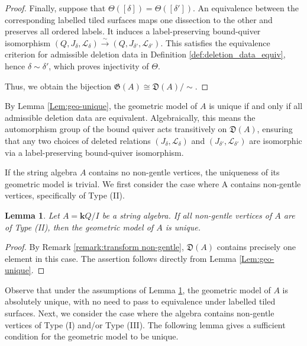 \documentclass[11pt]{amsart}
\numberwithin{equation}{section}
\newtheorem{lemma}[theorem]{Lemma}
\theoremstyle{definition}
\begin{document}
\begin{proof}
Finally, suppose that $\Theta([\delta])=\Theta([\delta'])$. An
equivalence between the corresponding labelled tiled surfaces maps
one dissection to the other and preserves all ordered labels. It induces a
label-preserving bound-quiver isomorphism
$(Q,J_\delta,\mathcal L_\delta)\xrightarrow{\sim}
(Q,J_{\delta'},\mathcal L_{\delta'})$.
This satisfies the equivalence criterion for admissible deletion data in Definition \ref{def:deletion_data_equiv}, hence \(\delta\sim\delta'\), which proves injectivity of \(\Theta\).

Thus, we obtain the bijection $\mathfrak{G}(A) \cong \mathfrak{D}(A)/{\sim}$.
\end{proof}


By Lemma \ref{Lem:geo-unique}, the geometric model of $A$ is unique if and only if all admissible deletion data are equivalent. Algebraically, this means the automorphism group of the bound quiver acts transitively on $\mathfrak{D}(A)$, ensuring that any two choices of deleted relations $(J_\delta, \mathcal{L}_\delta)$ and $(J_{\delta'}, \mathcal{L}_{\delta'})$ are isomorphic via a label-preserving bound-quiver isomorphism.

If the string algebra $A$ contains no non-gentle vertices, the uniqueness of its geometric model is trivial. We first consider the case where A contains non-gentle vertices, specifically of Type (II).

\begin{lemma} \label{lem:non-II}
Let $A=\mathbf{k}Q/I$ be a string algebra. If all non-gentle vertices of $A$ are of Type (II), then the geometric model of $A$ is unique.
\end{lemma}

\begin{proof}
By Remark \ref{remark:transform non-gentle}, $\mathfrak{D}(A)$ contains precisely one element in this case. The assertion follows directly from Lemma \ref{Lem:geo-unique}.
\end{proof}


Observe that under the assumptions of Lemma \ref{lem:non-II}, the geometric model of $A$ is absolutely unique, with no need to pass to equivalence under labelled tiled surfaces. Next, we consider the case where the algebra contains non-gentle vertices of Type (I) and/or Type (III). The following lemma gives a sufficient condition for the geometric model to be unique.
\end{document}
